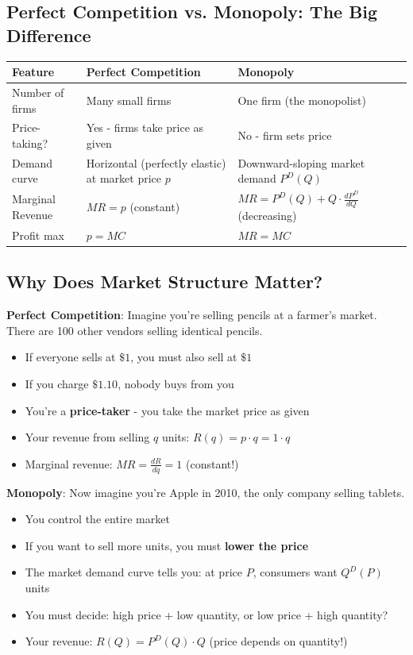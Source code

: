\documentclass[12pt]{article}
\begin{document}
\subsection{Perfect Competition vs. Monopoly: The Big Difference}

\begin{keyidea}
\begin{center}
\begin{tabular}{p{3cm}|p{5cm}|p{5cm}}
\toprule
\textbf{Feature} & \textbf{Perfect Competition} & \textbf{Monopoly} \\
\midrule
Number of firms & Many small firms & One firm (the monopolist) \\
\midrule
Price-taking? & Yes - firms take price as given & No - firm sets price \\
\midrule
Demand curve & Horizontal (perfectly elastic) at market price $p$ & Downward-sloping market demand $P^D(Q)$ \\
\midrule
Marginal Revenue & $MR = p$ (constant) & $MR = P^D(Q) + Q \cdot \frac{dP^D}{dQ}$ (decreasing) \\
\midrule
Profit max & $p = MC$ & $MR = MC$ \\
\bottomrule
\end{tabular}
\end{center}
\end{keyidea}

\subsection{Why Does Market Structure Matter?}

\textbf{Perfect Competition}: Imagine you're selling pencils at a farmer's market. There are 100 other vendors selling identical pencils.
\begin{itemize}
\item If everyone sells at $\$1$, you must also sell at $\$1$
\item If you charge $\$1.10$, nobody buys from you
\item You're a \textbf{price-taker} - you take the market price as given
\item Your revenue from selling $q$ units: $R(q) = p \cdot q = 1 \cdot q$
\item Marginal revenue: $MR = \frac{dR}{dq} = 1$ (constant!)
\end{itemize}

\textbf{Monopoly}: Now imagine you're Apple in 2010, the only company selling tablets.
\begin{itemize}
\item You control the entire market
\item If you want to sell more units, you must \textbf{lower the price}
\item The market demand curve tells you: at price $P$, consumers want $Q^D(P)$ units
\item You must decide: high price + low quantity, or low price + high quantity?
\item Your revenue: $R(Q) = P^D(Q) \cdot Q$ (price depends on quantity!)
\end{itemize}
\end{document}
